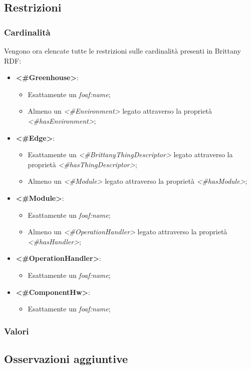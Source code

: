 \subsection{Restrizioni}
\subsubsection{Cardinalità}
Vengono ora elencate tutte le restrizioni sulle cardinalità presenti in Brittany RDF:
\begin{itemize}
	\item \textbf{<\#Greenhouse>}:
	\begin{itemize}
		\item Esattamente un \textit{foaf:name};
		\item Almeno un \textit{<\#Environment>} legato attraverso la proprietà \textit{<\#hasEnvironment>};
	\end{itemize}
	\item \textbf{<\#Edge>}:
	\begin{itemize}
		\item Esattamente un \textit{<\#BrittanyThingDescriptor>} legato attraverso la proprietà \textit{<\#hasThingDescriptor>};
		\item Almeno un \textit{<\#Module>} legato attraverso la proprietà \textit{<\#hasModule>};
	\end{itemize}
	\item \textbf{<\#Module>}:
	\begin{itemize}
		\item Esattamente un \textit{foaf:name};
		\item Almeno un \textit{<\#OperationHandler>} legato attraverso la proprietà \textit{<\#hasHandler>};
	\end{itemize}
	\item \textbf{<\#OperationHandler>}:
	\begin{itemize}
		\item Esattamente un \textit{foaf:name};
	\end{itemize}
	\item \textbf{<\#ComponentHw>}:
	\begin{itemize}
		\item Esattamente un \textit{foaf:name};
	\end{itemize}
\end{itemize}
\subsubsection{Valori}
\subsection{Osservazioni aggiuntive}
